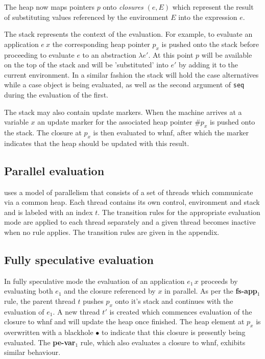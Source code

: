 \documentclass{llncs}
\begin{document}
The heap now maps pointers $p$ onto \emph{closures} $(e, E)$ which represent the result of substituting values referenced by the environment $E$ into the expression $e$. 

The stack represents the context of the evaluation. For example, to evaluate an application $e\:x$ the corresponding heap pointer $p_x$ is pushed onto the stack before proceeding to evaluate $e$ to an abstraction $\lambda e'$. At this point $p$ will be available on the top of the stack and will be 'substituted' into $e'$ by adding it to the current environment. In a similar fashion the stack will hold the case alternatives while a case object is being evaluated, as well as the second argument of \texttt{seq} during the evaluation of the first.

The stack may also contain update markers. When the machine arrives at a variable $x$ an update marker for the associated heap pointer \#$p_x$ is pushed onto the stack. The closure at $p_x$ is then evaluated to whnf, after which the marker indicates that the heap should be updated with this result.

\subsection{Parallel evaluation}
\ample uses a model of parallelism that consists of a set of threads which communicate via a common heap. Each thread contains its own control, environment and stack and is labeled with an index $t$. The transition rules for the appropriate evaluation mode are applied to each thread separately and a given thread becomes inactive when no rule applies. The transition rules are given in the appendix.

\subsection{Fully speculative evaluation}
In fully speculative mode the evaluation of an application $e_1\,x$ proceeds by evaluating both $e_1$ and the closure referenced by $x$ in parallel. As per the \textbf{fs-app$_1$} rule, the parent thread $t$ pushes $p_x$ onto it's stack and continues with the evaluation of $e_1$. A new thread $t'$ is created which commences evaluation of the closure to whnf and will update the heap once finished. The heap element at $p_x$ is overwritten with a blackhole $\bullet$ to indicate that this closure is presently being evaluated. The \textbf{pe-var$_1$} rule, which also evaluates a closure to whnf, exhibits similar behaviour.
\end{document}
